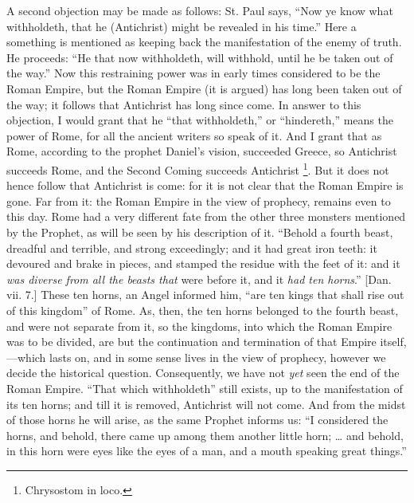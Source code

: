 A second objection may be made as follows: St. Paul says, ``Now
ye know what withholdeth, that he (Antichrist) might be revealed in
his time.'' Here a something is mentioned as keeping back the
manifestation of the enemy of truth. He proceeds: ``He that now
withholdeth, will withhold, until he be taken out of the way.''
Now this restraining power was in early times considered to be the
Roman Empire, but the Roman Empire (it is argued) has long been taken
out of the way; it follows that Antichrist has long since come. In
answer to this objection, I would grant that he ``that withholdeth,''
or ``hindereth,'' means the power of Rome, for all the ancient
writers so speak of it. And I grant that as Rome, according to
the prophet Daniel's vision, succeeded Greece, so Antichrist succeeds
Rome, and the Second Coming succeeds Antichrist \footnote{Chrysostom in loco.}. But it does not hence follow that Antichrist is come: for it
is not clear that the Roman Empire is gone. Far from it: the Roman
Empire in the view of prophecy, remains even to this day. Rome had a
very different fate from the other three monsters mentioned by the
Prophet, as will be seen by his description of it. ``Behold a
fourth beast, dreadful and terrible, and strong exceedingly; and it
had great iron teeth: it devoured and brake in pieces, and stamped the
residue with the feet of it: and it \emph{was diverse from all the beasts
that} were before it, and it \emph{had ten horns}.'' [Dan. vii.
7.] These ten horns, an Angel informed him, ``are ten kings that
shall rise out of this kingdom'' of Rome. As, then, the ten horns
belonged to the fourth beast, and were not separate from it, so the
kingdoms, into which the Roman Empire was to be divided, are but the
continuation and termination of that Empire itself,—which lasts on,
and in some sense lives in the view of prophecy, however we decide the
historical question. Consequently, we have not \emph{yet} seen the end
of the Roman Empire. ``That which withholdeth'' still exists,
up to the manifestation of its ten horns; and till it is removed,
Antichrist will not come. And from the midst of those horns he will
arise, as the same Prophet informs us: ``I considered the horns,
and behold, there came up among them another little horn; … and
behold, in this horn were eyes like the eyes of a man, and a mouth
speaking great things.''

